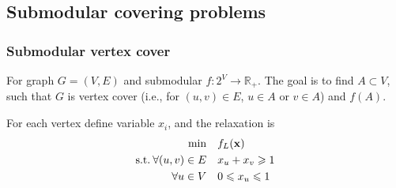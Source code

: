 \subsection{Submodular covering problems}
\subsubsection{Submodular vertex cover}
For graph $G=(V,E)$ and submodular $f: 2^V \to \mathbb{R}_+$. The goal is to find $A\subset V$, such that $G$ is vertex cover (i.e., for $ (u,v)\in E$, $u\in A$ or $v\in A$) and $f(A)$.

For each vertex define variable $x_i$, and the relaxation is 
\begin{align} \label{eq:scp_relax}
\min \quad&  f_L(\vb{x}) \\ 
\text{s.t.} \: \forall (u,v)\in E \quad&x_u+x_v \geqslant 1 \\
\forall u \in V \quad&0\leqslant x_u \leqslant 1 
\end{align}

